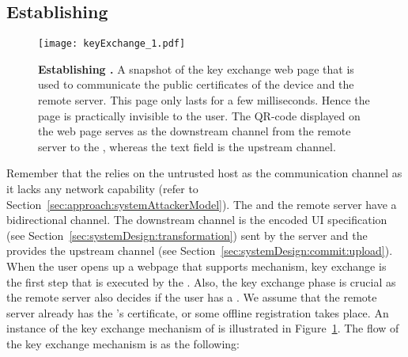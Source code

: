 \subsection{Establishing \tls}
\label{sec:confidentiality:tls}

\begin{figure}[t]
\centering
\texttt{[image: keyExchange\_1.pdf]}
\caption{\textbf{Establishing \tls.} A snapshot of the key exchange web page that is used to communicate the public certificates of the device and the remote server. This page only lasts for a few milliseconds. Hence the page is practically invisible to the user. The QR-code displayed on the web page serves as the downstream channel from the remote server to the \device, whereas the text field is the upstream channel.}
\spacesave
\label{fig:keyExchange}
\centering
\end{figure} 

Remember that the \device relies on the untrusted host as the communication channel as it lacks any network capability (refer to Section~\ref{sec:approach:systemAttackerModel}). The \device and the remote server have a bidirectional channel. The downstream channel is the encoded UI specification (see Section~\ref{sec:systemDesign:transformation}) sent by the server and the \name \js provides the upstream channel (see Section~\ref{sec:systemDesign:commit:upload}). 
When the user opens up a webpage that supports \name mechanism, key exchange is the first step that is executed by the \device. Also, the key exchange phase is crucial as the remote server also decides if the user has a \device. We assume that the remote server already has the \device's certificate, or some offline registration takes place. An instance of the key exchange mechanism of \name is illustrated in Figure~\ref{fig:keyExchange}. The flow of the key exchange mechanism is as the following:

